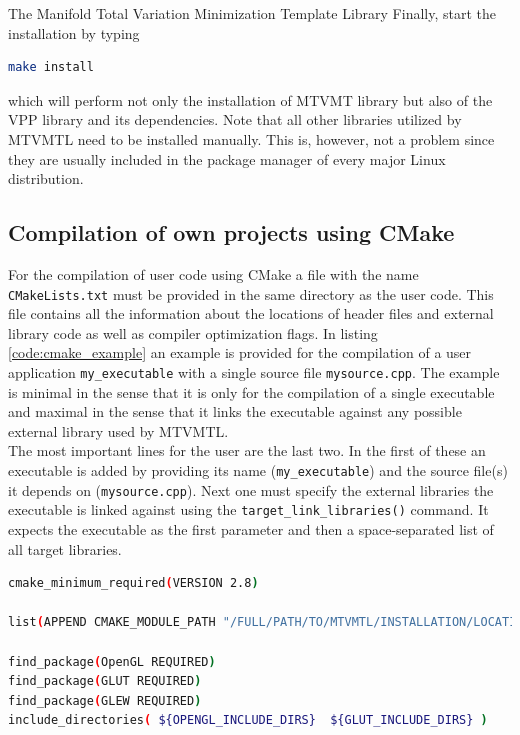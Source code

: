\begin{chapter}{The Manifold Total Variation Minimization Template Library}
Finally, start the installation by typing
\begin{lstlisting}[language=bash]
make install
\end{lstlisting}
which will perform not only the installation of MTVMT library but also of the VPP library and its dependencies. Note that
all other libraries utilized by MTVMTL need to be installed manually. This is, however, not a problem since they are usually
included in the package manager of every major Linux distribution.

\subsection{Compilation of own projects using CMake} %
\label{sub:CMakeCompilation}
For the compilation of user code using CMake a file with the name \texttt{CMakeLists.txt} must be provided in the same directory as the user code. 
This file contains all the information about the locations of header files and external library code as well as compiler optimization flags. In listing \ref{code:cmake_example} 
an example is provided for the compilation of a user application \texttt{my\_executable} with a single source file \texttt{mysource.cpp}. 
The example is minimal in the sense that it is only for the compilation of a single executable and maximal in the sense that it
links the executable against any possible external library used by MTVMTL.\\

The most important lines for the user are the last two. In the first of these an executable is added by providing its name (\texttt{my\_executable}) and the source file(s) it depends on 
(\texttt{mysource.cpp}). Next one must specify the external libraries the executable is linked against using the \texttt{target\_link\_libraries()} command. It expects the executable
as the first parameter and then a space-separated list of all target libraries. \\

\begin{lstlisting}[language=bash,label=code:cmake_example,caption={Example CMakeLists.txt}]
cmake_minimum_required(VERSION 2.8)

list(APPEND CMAKE_MODULE_PATH "/FULL/PATH/TO/MTVMTL/INSTALLATION/LOCATION/include/mtvmtl/SparseSuiteSupport")

find_package(OpenGL REQUIRED)
find_package(GLUT REQUIRED)
find_package(GLEW REQUIRED)
include_directories( ${OPENGL_INCLUDE_DIRS}  ${GLUT_INCLUDE_DIRS} )


\end{lstlisting}
\end{chapter}
